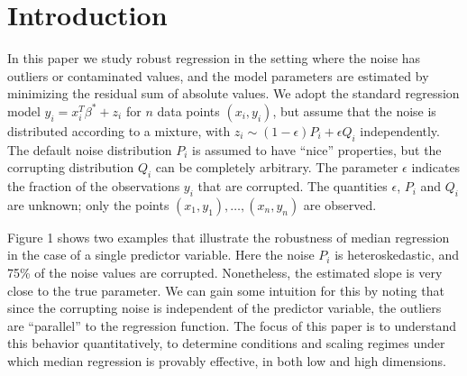 
\section{Introduction}
\label{sec:intro}

In this paper we study robust regression in the setting where the noise has outliers or contaminated values,
and the model parameters are estimated by minimizing the residual sum of absolute values. We adopt the standard regression model $y_i=x_i^T\beta^*+z_i$ for $n$ data points $(x_i,y_i)$, but assume that the noise is distributed according to a mixture, with $z_i\sim (1-\epsilon)P_i+\epsilon Q_i$ independently. The default noise distribution $P_i$ is assumed to have ``nice'' properties, but the corrupting distribution
$Q_i$ can be completely arbitrary. The parameter $\epsilon$ indicates the fraction of the observations $y_i$ that are corrupted. The quantities $\epsilon$, $P_i$ and $Q_i$ are unknown; only the points $(x_1, y_1), \ldots, (x_n, y_n)$ are observed.


Figure 1 shows two examples that illustrate the robustness of median regression
in the case of a single predictor variable. Here the noise $P_i$ is heteroskedastic, and 75\% of the noise values are corrupted. Nonetheless, the estimated slope is very close to the true parameter. We can gain some intuition for this by noting that since the corrupting noise is independent of the predictor variable, the outliers are ``parallel'' to the regression function. The focus of this paper is to understand this behavior quantitatively, to determine conditions and scaling regimes under which median regression is provably effective, in both low and high dimensions.

